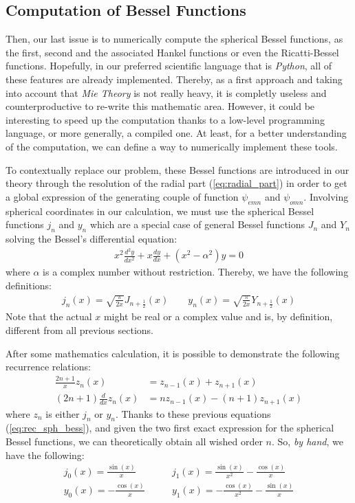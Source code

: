 \documentclass{article}
\numberwithin{equation}{section}
\begin{document}
\subsection{Computation of Bessel Functions}

Then, our last issue is to numerically compute the spherical Bessel functions, as the first, second and the associated Hankel functions or even the Ricatti-Bessel functions. Hopefully, in our preferred scientific language that is \textit{Python}, all of these features are already implemented. Thereby, as a first approach and taking into account that \textit{Mie Theory} is not really heavy, it is completly useless and counterproductive to re-write this mathematic area. However, it could be interesting to speed up the computation thanks to a low-level programming language, or more generally, a compiled one. At least, for a better understanding of the computation, we can define a way to numerically implement these tools.

To contextually replace our problem, these Bessel functions are introduced in our theory through the resolution of the radial part (\ref{eq:radial_part}) in order to get a global expression of the generating couple of function $\psi_{emn}$ and $\psi_{omn}$. Involving spherical coordinates in our calculation, we must use the spherical Bessel functions $j_{n}$ and $y_{n}$ which are a special case of general Bessel functions $J_{n}$ and $Y_{n}$ solving the Bessel's differential equation:
\begin{align}
x^{2}\frac{d^{2}y}{dx^{2}} + x\frac{dy}{dx} + (x^{2} - \alpha^{2})y = 0
\end{align}
where $\alpha$ is a complex number without restriction. Thereby, we have the following definitions:
\begin{align}
j_{n}(x)=\sqrt{\frac{\pi}{2x}}J_{n+\frac{1}{2}}(x) \qquad y_{n}(x)=\sqrt{\frac{\pi}{2x}}Y_{n+\frac{1}{2}}(x)
\end{align}
Note that the actual $x$ might be real or a complex value and is, by definition, different from all previous sections.

After some mathematics calculation, it is possible to demonstrate the following recurrence relations:
\begin{align}\label{eq:rec_sph_bess}
\frac{2n+1}{x}z_{n}(x) &= z_{n-1}(x) + z_{n+1}(x)\\
(2n+1)\frac{d}{dx}z_{n}(x) &= nz_{n-1}(x) - (n+1)z_{n+1}(x)
\end{align}
where $z_{n}$ is either $j_{n}$ or $y_{n}$. Thanks to these previous equations (\ref{eq:rec_sph_bess}), and given the two first exact expression for the spherical Bessel functions, we can theoretically obtain all wished order $n$. So, \textit{by hand}, we have the following:
\begin{equation}
\begin{aligned}
j_{0}(x)=\frac{\sin(x)}{x} \qquad &j_{1}(x)=\frac{\sin(x)}{x^{2}} - \frac{\cos(x)}{x}\\
y_{0}(x)=-\frac{\cos(x)}{x} \qquad &y_{1}(x)=-\frac{\cos(x)}{x^{2}}-\frac{\sin(x)}{x}
\end{aligned}
\end{equation}
\end{document}
